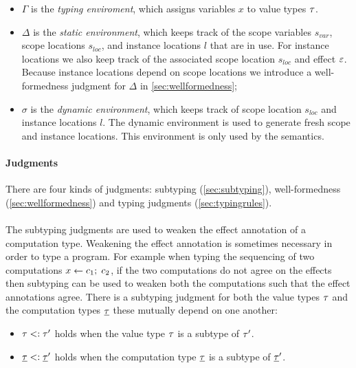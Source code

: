 {\begin{itemize}
\item $\Gamma$ is the \emph{typing enviroment}, which assigns variables $x$ to value types $\tau$.
\item $\Delta$ is the \emph{static environment}, which keeps track of the scope variables $s_{var}$, scope locations $s_{loc}$, and instance locations $l$ that are in use. For instance locations we also keep track of the associated scope location $s_{loc}$ and effect $\varepsilon$. Because instance locations depend on scope locations we introduce a well-formedness judgment for $\Delta$ in \cref{sec:wellformedness};
\item $\sigma$ is the \emph{dynamic environment}, which keeps track of scope location $s_{loc}$ and instance locations $l$. The dynamic environment is used to generate fresh scope and instance locations. This environment is only used by the semantics.
\end{itemize}

\paragraph{Judgments}
There are four kinds of judgments: subtyping (\cref{sec:subtyping}), well-formedness (\cref{sec:wellformedness}) and typing judgments (\cref{sec:typingrules}).
\\\\
The subtyping judgments are used to weaken the effect annotation of a computation type.
Weakening the effect annotation is sometimes necessary in order to type a program.
For example when typing the sequencing of two computations $x \leftarrow c_1 ;\; c_2$, if the two computations do not agree on the effects then subtyping can be used to weaken both the computations such that the effect annotations agree.
There is a subtyping judgment for both the value types $\tau$ and the computation types $\underline{\tau}$ these mutually depend on one another:
\begin{itemize}
\setlength\itemsep{0.5em}
\item $\tau <: \tau'$ holds when the value type $\tau$ is a subtype of $\tau'$.
\item $\underline{\tau} <: \underline{\tau}'$ holds when the computation type $\underline{\tau}$ is a subtype of $\underline{\tau}'$.
\end{itemize}

}
